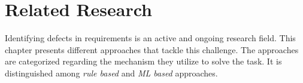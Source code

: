 \chapter{Related Research}
\label{chp:related_research}
Identifying defects in requirements is an active and ongoing research field.
This chapter presents different approaches that tackle this challenge.
The approaches are categorized regarding the mechanism they utilize to solve the task.
It is distinguished among \textit{rule based} and \textit{\ac{ML} based} approaches.



